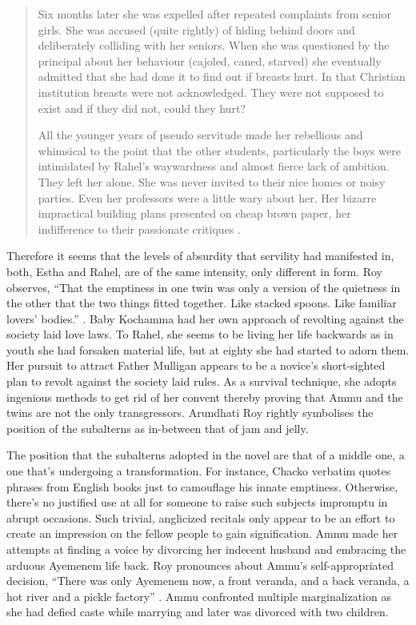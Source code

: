 \begin{quote}
  Six months later she was expelled after repeated complaints from senior girls. She was accused (quite rightly) of hiding behind doors and deliberately colliding with her seniors. When she was questioned by the principal about her behaviour (cajoled, caned, starved) she eventually admitted that she had done it to find out if breasts hurt. In that Christian institution breasts were not acknowledged. They were not supposed to exist and if they did not, could they hurt? \parencite[16]{Roy1997}

  All the younger years of pseudo servitude made her rebellious and whimsical to the point that the other students, particularly the boys were intimidated by Rahel's waywardness and almost fierce lack of ambition. They left her alone. She was never invited to their nice homes or noisy parties. Even her professors were a little wary about her. Her bizarre impractical building plans presented on cheap brown paper, her indifference to their passionate critiques \parencite[18]{Roy1997}. 
\end{quote}

Therefore it seems that the levels of absurdity that servility had manifested in, both, Estha and Rahel, are of the same intensity, only different in form. Roy observes, ``That the emptiness in one twin was only a version of the quietness in the other that the two things fitted together. Like stacked spoons. Like familiar lovers' bodies.'' \parencite[328]{Roy1997}. Baby Kochamma had her own approach of revolting against the society laid love laws. To Rahel, she seems to be living her life backwards as in youth she had forsaken material life, but at eighty she had started to adorn them. Her pursuit to attract Father Mulligan appears to be a novice's short-sighted plan to revolt against the society laid rules. As a survival technique, she adopts ingenious methods to get rid of her convent thereby proving that Ammu and the twins are not the only transgressors. Arundhati Roy rightly symbolises the position of the subalterns as in-between that of jam and jelly. 

The position that the subalterns adopted in the novel are that of a middle one, a one that's undergoing a transformation. For instance, Chacko verbatim quotes phrases from English books just to camouflage his innate emptiness. Otherwise, there's no justified use at all for someone to raise such subjects impromptu in abrupt occasions. Such trivial, anglicized recitals only appear to be an effort to create an impression on the fellow people to gain signification. Ammu made her attempts at finding a voice by divorcing her indecent husband and embracing the arduous Ayemenem life back. Roy pronounces about Ammu's self-appropriated decision, ``There was only Ayemenem now, a front veranda, and a back veranda, a hot river and a pickle factory'' \parencite[43]{Roy1997}. Ammu confronted multiple marginalization as she had defied caste while marrying and later was divorced with two children. 

